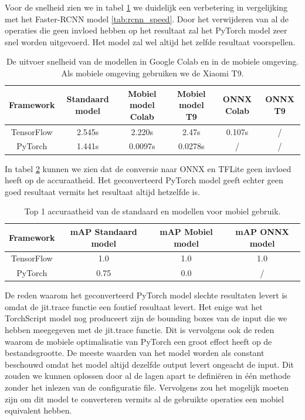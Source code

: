 Voor de snelheid zien we in tabel \ref{tab:yolo_speed} we duidelijk een verbetering in vergelijking met het Faster-RCNN model \ref{tab:rcnn_speed}.
Door het verwijderen van al de operaties die geen invloed hebben op het resultaat zal het PyTorch model zeer snel worden uitgevoerd.
Het model zal wel altijd het zelfde resultaat voorspellen.
\begin{table}[!ht]
    \caption{De uitvoer snelheid van de modellen in Google Colab en in de mobiele omgeving. Als mobiele omgeving gebruiken we de Xiaomi T9.}
\begin{tabular}{cccccc}
    \hline
    Framework & Standaard model & Mobiel model Colab & Mobiel model T9 & ONNX Colab & ONNX T9\\
    \hline
    TensorFlow & 2.545s & 2.220s & 2.47s & 0.107s & / \\
    PyTorch & 1.441s & 0.0097s & 0.0278s & / & / \\
    \hline
\end{tabular}
\label{tab:yolo_speed}
\end{table}

In tabel \ref{tab:yolo_acc} kunnen we zien dat de conversie naar ONNX en TFLite geen invloed heeft op de accuraatheid.
Het geconverteerd PyTorch model geeft echter geen goed resultaat vermits het resultaat altijd hetzelfde is.
\begin{table}[!ht]
    \caption{Top 1 accuraatheid van de standaard en modellen voor mobiel gebruik.}
\begin{tabular}{cccc}
    \hline
    Framework & mAP Standaard model & mAP Mobiel model & mAP ONNX model \\
    \hline
    TensorFlow & 1.0 & 1.0 & 1.0 \\
    PyTorch & 0.75 & 0.0 & / \\
    \hline
\end{tabular}
\label{tab:yolo_acc}
\end{table}

De reden waarom het geconverteerd PyTorch model slechte resultaten levert is omdat de jit.trace functie een foutief resultaat levert.
Het enige wat het TorchScript model nog produceert zijn de bounding boxes van de input die we hebben meegegeven met de jit.trace functie.
Dit is vervolgens ook de reden waarom de mobiele optimalisatie van PyTorch een groot effect heeft op de bestandsgrootte.
De meeste waarden van het model worden als constant beschouwd omdat het model altijd dezelfde output levert ongeacht de input.
Dit zouden we kunnen oplossen door al de lagen apart te defini\"eren in \'e\'en methode zonder het inlezen van de configuratie file.
Vervolgens zou het mogelijk moeten zijn om dit model te converteren vermits al de gebruikte operaties een mobiel equivalent hebben.
